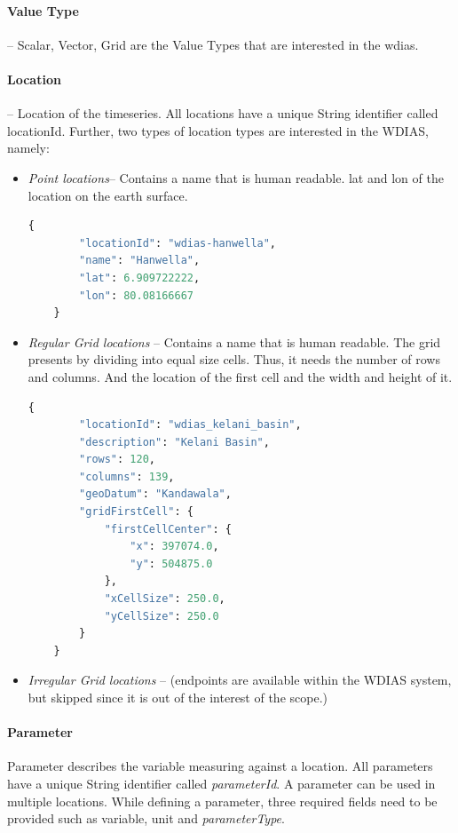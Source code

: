 \paragraph{Value Type}-- Scalar, Vector, Grid are the Value Types that are interested in the \acrshort{wdias}.

\paragraph{Location}-- Location of the timeseries. All locations have a unique String identifier called locationId. Further, two types of location types are interested in the WDIAS, namely:
\begin{itemize}
  \item \emph{Point locations}-- Contains a name that is human readable. lat and lon of the location on the earth surface.
  \begin{lstlisting}[language=Python]
    {
        "locationId": "wdias-hanwella",
        "name": "Hanwella",
        "lat": 6.909722222,
        "lon": 80.08166667
    }
  \end{lstlisting}
  \item \emph{Regular Grid locations} -- Contains a name that is human readable. The grid presents by dividing into equal size cells. Thus, it needs the number of rows and columns. 
  And the location of the first cell and the width and height of it.
  \begin{lstlisting}[language=Python]
      {
        "locationId": "wdias_kelani_basin",
        "description": "Kelani Basin",
        "rows": 120,
        "columns": 139,
        "geoDatum": "Kandawala",
        "gridFirstCell": {
            "firstCellCenter": {
                "x": 397074.0,
                "y": 504875.0
            },
            "xCellSize": 250.0,
            "yCellSize": 250.0
        }
    }
  \end{lstlisting}
  \item \emph{Irregular Grid locations} -- (endpoints are available within the WDIAS system, but skipped since it is out of the interest of the scope.)
\end{itemize}

\paragraph{Parameter}
Parameter describes the variable measuring against a location. All parameters have a unique String identifier called \emph{parameterId}. A parameter can be used in multiple locations. While defining a parameter, three required fields need to be provided such as variable, unit and \emph{parameterType}.

